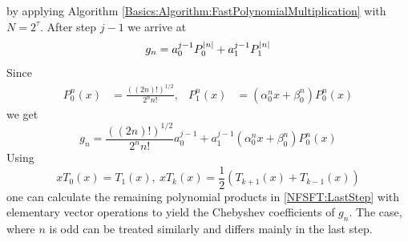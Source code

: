 by applying Algorithm \ref{Basics:Algorithm:FastPolynomialMultiplication} with $N=2^{\tau}$. 
After step $j-1$ we arrive at
\begin{equation}
  \nonumber
  g_n = a_{0}^{j-1} P_{0}^{\left\vert n\right\vert} + a_{1}^{j-1} P_{1}^{\left\vert n\right\vert}
\end{equation}
Since 
\begin{align}
  \nonumber
  P_{0}^n(x) & = \frac{\left( \left( 2n \right) ! \right)^{1/2}}{2^n n!}, & P_{1}^n(x) & = \left(\alpha_{0}^nx + \beta_{0}^n\right)P_{0}^n(x)
\end{align} 
we get
\begin{equation}
  \label{NFSFT:LastStep}
  g_n = \frac{\left( \left( 2n \right) ! \right)^{1/2}}{2^n n!} a_{0}^{j-1} + a_{1}^{j-1} \left(\alpha_{0}^nx + \beta_{0}^n\right)P_{0}^n(x)
\end{equation}
Using 
\begin{equation}
  \nonumber
  xT_{0}(x) = T_{1}(x),\ xT_{k}(x) = \frac{1}{2}\left( T_{k+1}(x) + T_{k-1}(x) \right)
\end{equation}
one can calculate the remaining polynomial products in \eqref{NFSFT:LastStep} with elementary 
vector operations to yield the Chebyshev coefficients of $g_n$. The case, where $n$ is odd can 
be treated similarly and differs mainly in the last step.

